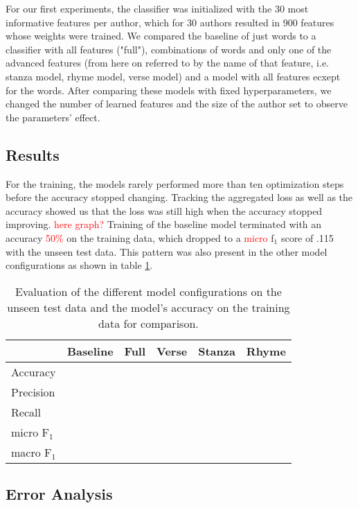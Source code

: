 \documentclass[11pt]{article}
\begin{document}
For our first experiments, the classifier was initialized with the 30 most informative features per author, which for
30 authors resulted in 900 features whose weights were trained. We compared the baseline of just words to a classifier 
with all features ("full"), combinations of words and only one of the advanced features (from here on referred to by the name
of that feature, i.e. stanza model, rhyme model, verse model) and a model with all features ecxept for the words.
After comparing these models with fixed hyperparameters, we changed the number of learned features and the size of the 
author set to observe the parameters' effect.

\subsection{Results}
For the training, the models rarely performed more than ten optimization steps before the accuracy stopped changing. 
Tracking the aggregated loss as well as the accuracy showed us that the loss was still high when the accuracy stopped
improving. \textcolor{red}{here graph?} Training of the baseline model terminated with an accuracy \textcolor{red}{50\%} on the training data,
which dropped to a \textcolor{red}{micro} f$_1$ score of .115 with the unseen test data. This pattern was also present in the other model
configurations as shown in table \ref{tab:eval}.

\begin{table}
      \begin{tabular}{lccccc}\hline
            & Baseline & Full & Verse & Stanza & Rhyme\\\hline
            Accuracy & \\
            Precision & \\
            Recall & \\
            micro F$_1$ & \\
            macro F$_1$ & &&&&\\\hline
      \end{tabular}
      \caption{Evaluation of the different model configurations on the unseen test data and the model's
      accuracy on the training data for comparison.}\label{tab:eval}
\end{table}


\subsection{Error Analysis}
\end{document}
